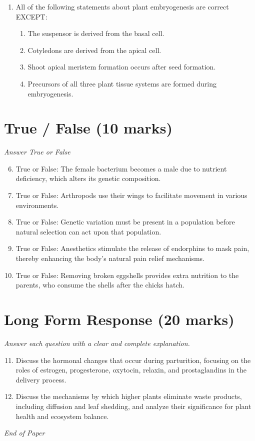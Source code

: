 \documentclass[12pt]{article}
\begin{document}
\begin{enumerate}[label=\arabic*.]
\begin{enumerate}[label=(\alph*)]
    \item Animals migrate based on the patterns of the stars alone.
    \item Animals follow changes in air pressure for migration.
    \item Animals use temperature changes for migration.
\end{enumerate}
\item All of the following statements about plant embryogenesis are correct EXCEPT:
\begin{enumerate}[label=(\alph*)]
    \item The suspensor is derived from the basal cell.
    \item Cotyledons are derived from the apical cell.
    \item Shoot apical meristem formation occurs after seed formation.
    \item Precursors of all three plant tissue systems are formed during embryogenesis.
\end{enumerate}
\end{enumerate}

\section*{True / False (10 marks)}
\textit{Answer True or False}
\begin{enumerate}[label=\arabic*.]
\setcounter{enumi}{5}
\item True or False: The female bacterium becomes a male due to nutrient deficiency, which alters its genetic composition.
\item True or False: Arthropods use their wings to facilitate movement in various environments.
\item True or False: Genetic variation must be present in a population before natural selection can act upon that population.
\item True or False: Anesthetics stimulate the release of endorphins to mask pain, thereby enhancing the body's natural pain relief mechanisms.
\item True or False: Removing broken eggshells provides extra nutrition to the parents, who consume the shells after the chicks hatch.
\end{enumerate}

\section*{Long Form Response (20 marks)}
\textit{Answer each question with a clear and complete explanation.}
\begin{enumerate}[label=\arabic*.]
\setcounter{enumi}{10}
\item Discuss the hormonal changes that occur during parturition, focusing on the roles of estrogen, progesterone, oxytocin, relaxin, and prostaglandins in the delivery process.
\item Discuss the mechanisms by which higher plants eliminate waste products, including diffusion and leaf shedding, and analyze their significance for plant health and ecosystem balance.
\end{enumerate}

\vfill
\noindent\textit{End of Paper}
\end{document}
